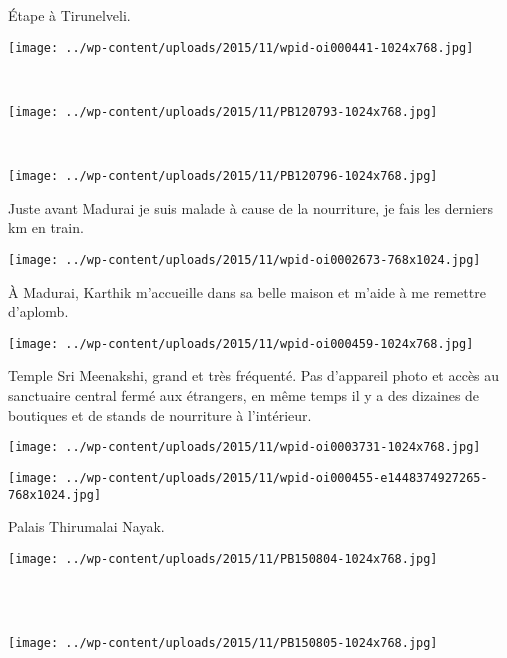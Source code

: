  Étape à Tirunelveli. 
\begin{center} \texttt{[image: ../wp-content/uploads/2015/11/wpid-oi000441-1024x768.jpg]} \end{center}
\vspace{-\topsep}
\pagebreak

~\\
\vspace{0.5mm}
\begin{center} \texttt{[image: ../wp-content/uploads/2015/11/PB120793-1024x768.jpg]} \end{center}
~
\begin{center} \texttt{[image: ../wp-content/uploads/2015/11/PB120796-1024x768.jpg]} \end{center}
\vspace{-\topsep}
\pagebreak
 
 Juste avant Madurai je suis malade à cause de la nourriture, je fais les derniers km en train. 
\begin{center} \texttt{[image: ../wp-content/uploads/2015/11/wpid-oi0002673-768x1024.jpg]} \end{center}

 À Madurai, Karthik m'accueille dans sa belle maison et m'aide à me remettre d'aplomb. 
\begin{center} \texttt{[image: ../wp-content/uploads/2015/11/wpid-oi000459-1024x768.jpg]} \end{center}

 Temple Sri Meenakshi, grand et très fréquenté. Pas d'appareil photo et accès au sanctuaire central fermé aux étrangers, en même temps il y a des dizaines de boutiques et de stands de nourriture à l'intérieur. 
\begin{center} \texttt{[image: ../wp-content/uploads/2015/11/wpid-oi0003731-1024x768.jpg]} \end{center}
\begin{center} \texttt{[image: ../wp-content/uploads/2015/11/wpid-oi000455-e1448374927265-768x1024.jpg]} \end{center}

  Palais Thirumalai Nayak. 
\begin{center} \texttt{[image: ../wp-content/uploads/2015/11/PB150804-1024x768.jpg]} \end{center}
~\\~\\
\begin{center} \texttt{[image: ../wp-content/uploads/2015/11/PB150805-1024x768.jpg]} \end{center}
\vspace{-\topsep}
\pagebreak

